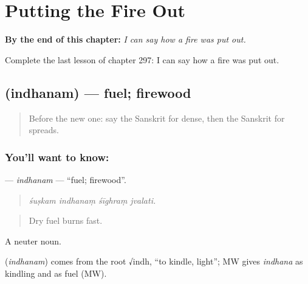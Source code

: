 
\chapter{Putting the Fire Out}
\label{ch:sa-putting-the-fire-out}

\begin{chapteropening}
\textbf{By the end of this chapter:} \emph{I can say how a fire was put out.}

Complete the last lesson of chapter 297: I can say how a fire was put out.
\end{chapteropening}

\section[\texorpdfstring{\sk{इन्धनम्} (indhanam)}{इन्धनम् (indhanam)}]{ (indhanam) — fuel; firewood}

\label{lesson:SA-C297-indhanam}



\begin{quote}
Before the new one: say the Sanskrit for dense, then the Sanskrit for spreads.
\end{quote}

\subsection*{You'll want to know: }
\textbf{} — \emph{indhanam} — \textquotedblleft{}fuel; firewood\textquotedblright{}.

\begin{quote}
   
\end{quote}

\begin{quote}
\emph{śuṣkam indhanaṃ śīghraṃ jvalati.}
\end{quote}

\begin{quote}
Dry fuel burns fast.
\end{quote}

A neuter noun.

\begin{cousinweb}
\textbf{} (\emph{indhanam}) comes from the root √indh, \textquotedblleft{}to kindle, light\textquotedblright{}; MW gives \emph{indhana} as kindling and as fuel (MW).
\end{cousinweb}

